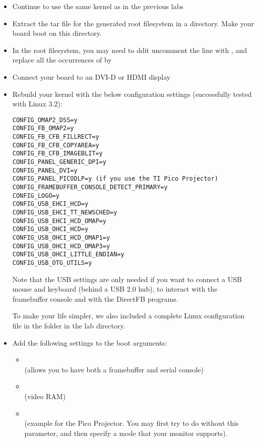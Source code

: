 \begin{itemize}
\item Continue to use the same kernel as in the previous labs
\item Extract the tar file for the generated root filesystem in a
 directory. Make your board boot on this directory. 
\item In the root filesystem, you may need to ddit 
  uncomment the line with , and replace all the occurrences
  of  by 
\item Connect your board to an DVI-D or HDMI display
\item Rebuild your kernel with the below configuration settings
(successfully tested with Linux 3.2):
\begin{verbatim}
CONFIG_OMAP2_DSS=y
CONFIG_FB_OMAP2=y
CONFIG_FB_CFB_FILLRECT=y
CONFIG_FB_CFB_COPYAREA=y
CONFIG_FB_CFB_IMAGEBLIT=y
CONFIG_PANEL_GENERIC_DPI=y
CONFIG_PANEL_DVI=y
CONFIG_PANEL_PICODLP=y (if you use the TI Pico Projector)
CONFIG_FRAMEBUFFER_CONSOLE_DETECT_PRIMARY=y
CONFIG_LOGO=y
CONFIG_USB_EHCI_HCD=y
CONFIG_USB_EHCI_TT_NEWSCHED=y
CONFIG_USB_EHCI_HCD_OMAP=y
CONFIG_USB_OHCI_HCD=y
CONFIG_USB_OHCI_HCD_OMAP1=y
CONFIG_USB_OHCI_HCD_OMAP3=y
CONFIG_USB_OHCI_LITTLE_ENDIAN=y
CONFIG_USB_OTG_UTILS=y
\end{verbatim}

Note that the USB settings are only needed if you want to connect a USB
mouse and keyboard (behind a USB 2.0 hub), to interact with the
framebuffer console and with the DirectFB programs.

To make your life simpler, we also included a complete Linux
configuration file in the  folder in the lab directory.

\item Add the following settings to the boot arguments:
  \begin{itemize}
  \item {}\\(allows you to have both a framebuffer
    and serial console)
  \item {}\\(video RAM)
  \item {}\\(example for the
    Pico Projector. You may first try to do without this parameter,
    and then specify a mode that your monitor supports).
  \end{itemize}
\end{itemize}

